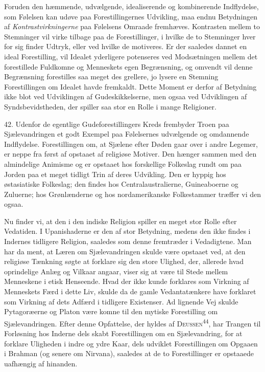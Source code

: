 \documentclass[12pt,a4paper,openany]{book}
\newcommand{\opage}[1]{\marginnote{\footnotesize\textit{[#1]}}}
\begin{document}
Foruden den hæmmende, udvælgende, idealiserende og kombinerende
Indflydelse, som Følelsen kan udøve paa Forestillingernes Udvikling, maa
endnu Betydningen af \textit{Kontrastvirkningerne} paa Følelsens Omraade
fremhæves. Kontrasten mellem to Stemninger vil virke tilbage paa de
Forestillinger, i hvilke de to Stemninger hver for sig finder Udtryk,
eller ved hvilke de motiveres. Er der saaledes dannet en ideal
Forestilling, vil Idealet yderligere potenseres ved Modsætningen mellem
det forestillede Fuldkomne og Menneskets egen Begrænsning, og omvendt
vil denne Begrænsning forestilles saa meget des grellere, jo lysere en
Stemning Forestillingen om Idealet havde fremkaldt. Dette Moment er
derfor af Betydning ikke blot ved Udviklingen af Gudeskikkelserne, men
ogsaa ved Udviklingen af Syndsbevidstheden, der spiller saa stor en
Rolle i mange Religioner.

42. Udenfor de egentlige Gudeforestillingers Kreds frembyder Troen paa
Sjælevandringen et godt Exempel paa Følelsernes udvælgende og omdannende
Indflydelse. Forestillingen om, at Sjælene efter Døden gaar over i andre
Legemer, er neppe fra først
\opage{98}af opstaaet af religiøse Motiver. Den hænger sammen med den
almindelige Animisme og er opstaaet hos forskellige Folkeslag rundt om
paa Jorden paa et meget tidligt Trin af deres Udvikling. Den er hyppig
hos østasiatiske Folkeslag; den findes hos Centralaustralierne,
Guineaboerne og Zuluerne; hos Grønlænderne og hos nordamerikanske
Folkestammer træffer vi den ogsaa.

Nu finder vi, at den i den indiske Religion spiller en meget stor Rolle
efter Vedatiden. I Upanishaderne er den af stor Betydning, medens den
ikke findes i Indernes tidligere Religion, saaledes som denne fremtræder
i Vedadigtene. Man har da ment, at Læren om Sjælevandringen skulde være
opstaaet ved, at den religiøse Tænkning søgte at forklare sig den store
Ulighed, der, allerede hvad oprindelige Anlæg og Vilkaar angaar, viser
sig at være til Stede mellem Menneskene i etisk Henseende. Hvad der ikke
kunde forklares som Virkning af Menneskets Færd i dette Liv, skulde da
de gamle Vedantatænkere have forklaret som Virkning af dets Adfærd i
tidligere Existenser. Ad lignende Vej skulde Pytagoræerne og Platon være
komne til den mytiske Forestilling om Sjælevandringen. Efter denne
Opfattelse, der hyldes af \textsc{Deussen}\textsuperscript{44}, har
Trangen til Forløsning hos Inderne dels skabt Forestillingen om en
Sjælevandring, for at forklare Uligheden i indre og ydre Kaar, dels
udviklet Forestillingen om Opgaaen i Brahman (og senere om Nirvana),
saaledes at de to Forestillinger er opstaaede uafhængig af hinanden.
\end{document}

